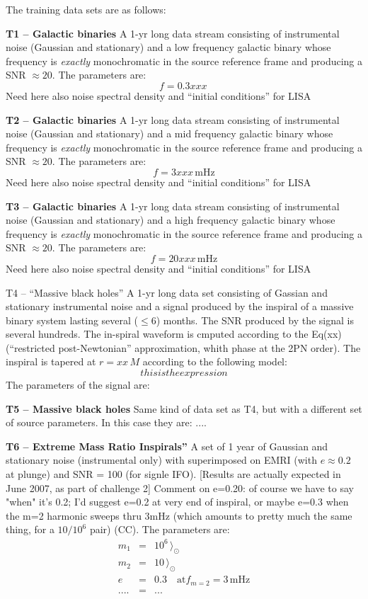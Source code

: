 \documentclass[11pt]{report}
\def\be{\begin{equation}}
\def\ee{\end{equation}}
\def\bea{\begin{eqnarray}}
\def\eea{\end{eqnarray}}
\newcommand{\M}{\rangle}
\begin{document}
The training data sets are as follows:

\begin{description}

\item{{\bf T1 -- Galactic binaries}} A 1-yr long data stream consisting of instrumental noise (Gaussian and stationary) and a low frequency galactic binary whose frequency is {\em exactly} monochromatic in the source reference frame and producing a SNR $\approx 20$. The parameters are:
\be
f = 0.3xxx\,
\ee
Need here also noise spectral density and ``initial conditions'' for LISA

\item{{\bf T2 -- Galactic binaries}} A 1-yr long data stream consisting of instrumental noise (Gaussian and stationary) and a mid frequency galactic binary whose frequency is {\em exactly} monochromatic in the source reference frame and producing a SNR $\approx 20$. The parameters are:
\be
f = 3 xxx\,\mathrm{mHz}
\ee
Need here also noise spectral density and ``initial conditions'' for LISA

\item{{\bf T3 -- Galactic binaries}} A 1-yr long data stream consisting of instrumental noise (Gaussian and stationary) and a high frequency galactic binary whose frequency is {\em exactly} monochromatic in the source reference frame and producing a SNR $\approx 20$. The parameters are:
\be
f = 20 xxx\,\mathrm{mHz}
\ee
Need here also noise spectral density and ``initial conditions'' for LISA

\item{T4 -- ``Massive black holes''} A 1-yr long data set consisting of Gassian and stationary instrumental noise and a signal produced by the inspiral of a massive binary system lasting several ($\le 6$) months. The SNR produced by the signal is several hundreds. The in-spiral waveform is cmputed according to the Eq(xx) (``restricted post-Newtonian'' approximation, whith phase at the 2PN order). The inspiral is tapered at $r = xx\,M$ according to the following model:
\be
this is the expression
\ee
The parameters of the signal are:

\item{{\bf T5 -- Massive black holes}} Same kind of data set as T4, but with a different set of source parameters. In this case they are: ....


\item{{\bf T6 -- Extreme Mass Ratio Inspirals''}} A set of 1 year of Gaussian and stationary noise (instrumental only) with superimposed on EMRI (with $e \approx 0.2$ at plunge) and SNR = 100 (for signle IFO). [Results are actually expected in June 2007, as part of challenge 2]
Comment on e=0.20: of course we have to say "when" it's 0.2; I'd suggest e=0.2 at very end of inspiral, or maybe
e=0.3  when the m=2 harmonic sweeps thru 3mHz (which amounts to pretty much the same thing, for a $10/10^6$ pair) (CC). The parameters are:
\bea
m_1 & = & 10^6\,\M_\odot \\
m_2 & = & 10\,\M_\odot \\
e & = & 0.3 \quad\mathrm{at} f_{m = 2} = 3\,\mathrm{mHz}\\
.... & = & ...
\eea



\end{description}
\end{document}
